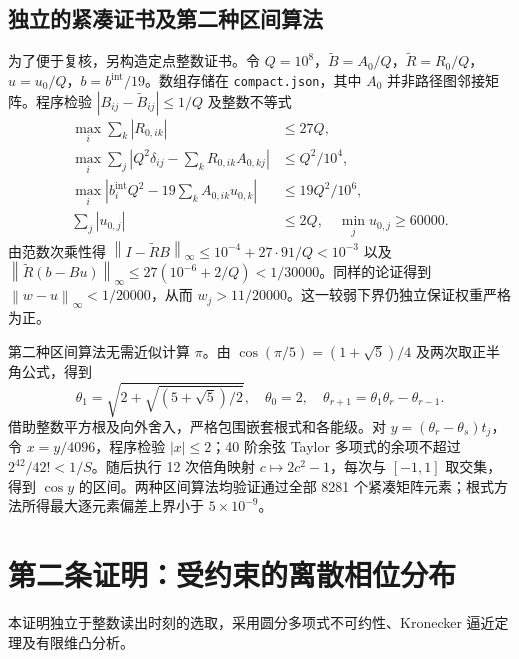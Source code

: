\documentclass[11pt,a4paper]{article}
\newcommand{\norm}[1]{\left\lVert #1\right\rVert_\infty}
\begin{document}
\subsection{独立的紧凑证书及第二种区间算法}
为了便于复核，另构造定点整数证书。令 $Q=10^8$，$\widetilde B=A_0/Q$，$\widetilde R=R_0/Q$，$u=u_0/Q$，$b=b^{\mathrm{int}}/19$。数组存储在 \texttt{compact.json}，其中 $A_0$ 并非路径图邻接矩阵。程序检验 $|B_{ij}-\widetilde B_{ij}|\le1/Q$ 及整数不等式
\begin{align*}
\max_i\sum_k|R_{0,ik}|&\le27Q,\\
\max_i\sum_j|Q^2\delta_{ij}-\sum_kR_{0,ik}A_{0,kj}|&\le Q^2/10^4,\\
\max_i|b_i^{\mathrm{int}}Q^2-19\sum_k A_{0,ik}u_{0,k}|&\le 19Q^2/10^6,\\
\sum_j |u_{0,j}|&\le2Q,\quad\min_j u_{0,j}\ge60000.
\end{align*}
由范数次乘性得 $\norm{I-\widetilde R B}\le10^{-4}+27\cdot91/Q<10^{-3}$ 以及 $\norm{\widetilde R(b-Bu)}\le27(10^{-6}+2/Q)<1/30000$。同样的论证得到 $\norm{w-u}<1/20000$，从而 $w_j>11/20000$。这一较弱下界仍独立保证权重严格为正。

第二种区间算法无需近似计算 $\pi$。由 $\cos(\pi/5)=(1+\sqrt5)/4$ 及两次取正半角公式，得到
\[
\theta_1=\sqrt{2+\sqrt{(5+\sqrt5)/2}},\quad \theta_0=2,\quad\theta_{r+1}=\theta_1\theta_r-\theta_{r-1}.
\]
借助整数平方根及向外舍入，严格包围嵌套根式和各能级。对 $y=(\theta_r-\theta_s)t_j$，令 $x=y/4096$，程序检验 $|x|\le2$；40 阶余弦 Taylor 多项式的余项不超过 $2^{42}/42!<1/S$。随后执行 12 次倍角映射 $c\mapsto2c^2-1$，每次与 $[-1,1]$ 取交集，得到 $\cos y$ 的区间。两种区间算法均验证通过全部 8281 个紧凑矩阵元素；根式方法所得最大逐元素偏差上界小于 $5\times10^{-9}$。
\section{第二条证明：受约束的离散相位分布}
本证明独立于整数读出时刻的选取，采用圆分多项式不可约性、Kronecker 逼近定理\cite{hardy}及有限维凸分析\cite{rock}。
\end{document}
